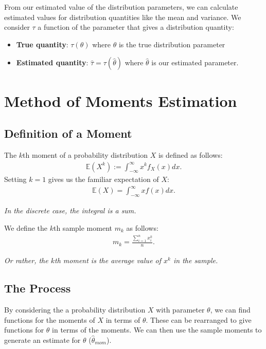 \documentclass[a4paper, 12pt, twoside]{article}
\begin{document}
From our estimated value of the distribution parameters, we can
calculate estimated values for distribution quantities like the
mean and variance. We consider $\tau$ a function of the parameter
that gives a distribution quantity:

\begin{itemize}
    \item \textbf{True quantity}: $\tau(\theta)$ where $\theta$
          is the true distribution parameter
    \item \textbf{Estimated quantity}:
          $\hat{\tau} = \tau(\hat{\theta})$ where $\hat{\theta}$ is our
          estimated parameter.
\end{itemize}

\section{Method of Moments Estimation}

\subsection{Definition of a Moment}

The $k$th moment of a probability distribution $X$ is defined as
follows:
\begin{align*}
    \mathbb{E}(X^k) := \int_{-\infty}^{\infty} x^k f_X(x) dx.
\end{align*}
Setting $k = 1$ gives us the familiar expectation of $X$:
\begin{align*}
    \mathbb{E}(X) = \int_{-\infty}^{\infty} x f(x) dx.
\end{align*}

\textit{In the discrete case, the integral is a sum.}

\vspace{\baselineskip}

We define the $k$th sample moment $m_k$ as follows:
\begin{align*}
    m_k = \frac{\sum_{i = 1}^{n} x_i^k}{n}.
\end{align*}

\textit{Or rather, the $k$th moment is the average value of $x^k$
    in the sample.}

\subsection{The Process}

By considering the a probability distribution $X$ with parameter $\theta$,
we can find functions for the moments of $X$ in terms of $\theta$. These
can be rearranged to give functions for $\theta$ in terms of the
moments. We can then use the sample moments to generate an estimate
for $\theta$ ($\hat\theta_{mom}$).
\end{document}
